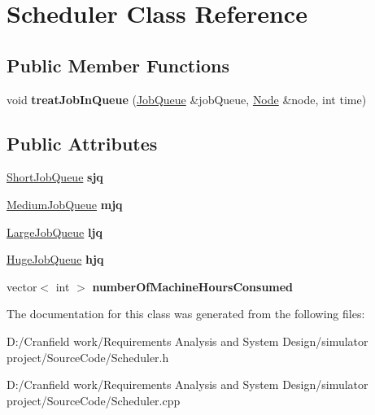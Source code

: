 \hypertarget{class_scheduler}{}\section{Scheduler Class Reference}
\label{class_scheduler}
\subsection*{Public Member Functions}
\begin{DoxyCompactItemize}
\item 
\mbox{\label{class_scheduler_a9a97c1e371779013d1f391047831132b}} 
void {\bfseries treat\+Job\+In\+Queue} (\mbox{\hyperlink{class_job_queue}{Job\+Queue}} \&job\+Queue, \mbox{\hyperlink{class_node}{Node}} \&node, int time)
\end{DoxyCompactItemize}
\subsection*{Public Attributes}
\begin{DoxyCompactItemize}
\item 
\mbox{\label{class_scheduler_a230bcf2e686da11204241df858aee185}} 
\mbox{\hyperlink{class_short_job_queue}{Short\+Job\+Queue}} {\bfseries sjq}
\item 
\mbox{\label{class_scheduler_a64b5c8f9d4801e0ce53b20a3915ba72a}} 
\mbox{\hyperlink{class_medium_job_queue}{Medium\+Job\+Queue}} {\bfseries mjq}
\item 
\mbox{\label{class_scheduler_a235ae26896fab67995f166678bf0b506}} 
\mbox{\hyperlink{class_large_job_queue}{Large\+Job\+Queue}} {\bfseries ljq}
\item 
\mbox{\label{class_scheduler_a6f057765dd7084c1b0f37517eb90fcdb}} 
\mbox{\hyperlink{class_huge_job_queue}{Huge\+Job\+Queue}} {\bfseries hjq}
\item 
\mbox{\label{class_scheduler_a14db1ba2a7ea1e676e75bd254e0418a4}} 
vector$<$ int $>$ {\bfseries number\+Of\+Machine\+Hours\+Consumed}
\end{DoxyCompactItemize}


The documentation for this class was generated from the following files\+:\begin{DoxyCompactItemize}
\item 
D\+:/\+Cranfield work/\+Requirements Analysis and System Design/simulator project/\+Source\+Code/Scheduler.\+h\item 
D\+:/\+Cranfield work/\+Requirements Analysis and System Design/simulator project/\+Source\+Code/Scheduler.\+cpp\end{DoxyCompactItemize}

